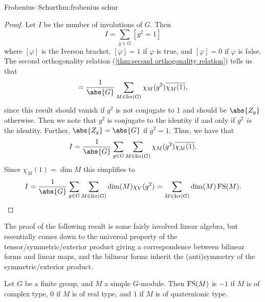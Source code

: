 \begin{thm}{Frobenius--Schur}{thm:frobenius schur}
\begin{proof}
        Let \(I\) be the number of involutions of \(G\).
        Then
        \begin{equation}
            I = \sum_{g \in G} [g^2 = 1]
        \end{equation}
        where \([\varphi]\) is the Iverson bracket, \([\varphi] = 1\) if \(\varphi\) is true, and \([\varphi] = 0\) if \(\varphi\) is false.
        The second orthogonality relation (\cref{thm:second orthogonality relation}) tells us that
        \begin{equation}
            [g^2 = 1] = \frac{1}{\abs{G}} \sum_{M \in \Irr(G)} \chi_M(g^2) \overline{\chi_M(1)},
        \end{equation}
        since this result should vanish if \(g^2\) is not conjugate to \(1\) and should be \(\abs{Z_g}\) otherwise.
        Then we note that \(g^2\) is conjugate to the identity if and only if \(g^2\) \emph{is} the identity.
        Further, \(\abs{Z_g} = \abs{G}\) if \(g^2 = 1\).
        Thus, we have that
        \begin{equation}
            I = \frac{1}{\abs{G}}\sum_{g \in G} \sum_{M \in \Irr(G)} \chi_M(g^2) \overline{\chi_M(1)}.
        \end{equation}
        Since \(\chi_M(1) = \dim M\) this simplifies to
        \begin{equation}
            I = \frac{1}{\abs{G}} \sum_{g \in G} \sum_{M \in \Irr(G)} \dim(M) \chi_V(g^2) = \sum_{M \in \Irr(G)} \dim(M) \frobeniusSchur(M).
        \end{equation}
    \end{proof}
\end{thm}

The proof of the following result is some fairly involved linear algebra, but essentially comes down to the universal property of the tensor/symmetric/exterior product giving a correspondence between bilinear forms and linear maps, and the bilinear forms inherit the (anti)symmetry of the symmetric/exterior product.

\begin{prp}{}{}
    Let \(G\) be a finite group, and \(M\) a simple \(G\)-module.
    Then \(\operatorname{FS}(M)\) is \(-1\) if \(M\) is of complex type, \(0\) if \(M\) is of real type, and \(1\) if \(M\) is of quaternionic type.
\end{prp}

